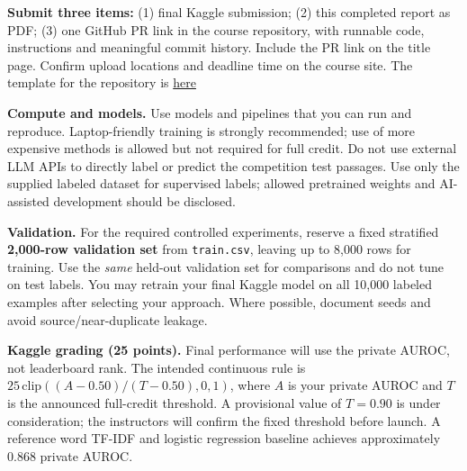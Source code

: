 \documentclass[11pt,letterpaper]{article}
\begin{document}
\textbf{Submit three items:} (1) final Kaggle submission; (2) this completed report as PDF; (3) one GitHub PR link in the course repository, with runnable code, instructions and meaningful commit history. Include the PR link on the title page. Confirm upload locations and deadline time on the course site. The template for the repository is \href{https://github.com/sekhari/human-or-ai-submissions}{here}

\textbf{Compute and models.} Use models and pipelines that you can run and reproduce. Laptop-friendly training is strongly recommended; use of more expensive methods is allowed but not required for full credit. Do not use external LLM APIs to directly label or predict the competition test passages. Use only the supplied labeled dataset for supervised labels; allowed pretrained weights and AI-assisted development should be disclosed.

\textbf{Validation.} For the required controlled experiments, reserve a fixed stratified \textbf{2,000-row validation set} from \texttt{train.csv}, leaving up to 8,000 rows for training. Use the \emph{same} held-out validation set for comparisons and do not tune on test labels. You may retrain your final Kaggle model on all 10,000 labeled examples after selecting your approach. Where possible, document seeds and avoid source/near-duplicate leakage.

\textbf{Kaggle grading (25 points).} Final performance will use the private AUROC, not leaderboard rank. The intended continuous rule is $25\,\mathrm{clip}((A-0.50)/(T-0.50),0,1)$, where $A$ is your private AUROC and $T$ is the announced full-credit threshold. A provisional value of $T=0.90$ is under consideration; the instructors will confirm the fixed threshold before launch. A reference word TF-IDF and logistic regression baseline achieves approximately 0.868 private AUROC.
\end{document}
